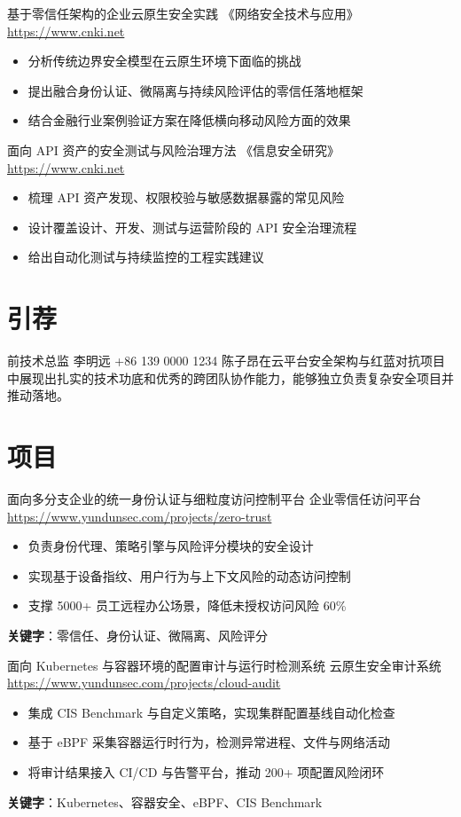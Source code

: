 \documentclass[a4paper, serif, 10pt]{moderncv}
\begin{document}
        {基于零信任架构的企业云原生安全实践}
        {《网络安全技术与应用》}
        {\url{https://www.cnki.net}}
        {}
        {\begin{itemize}
\item 分析传统边界安全模型在云原生环境下面临的挑战
\item 提出融合身份认证、微隔离与持续风险评估的零信任落地框架
\item 结合金融行业案例验证方案在降低横向移动风险方面的效果
\end{itemize}}

        {面向 API 资产的安全测试与风险治理方法}
        {《信息安全研究》}
        {\url{https://www.cnki.net}}
        {}
        {\begin{itemize}
\item 梳理 API 资产发现、权限校验与敏感数据暴露的常见风险
\item 设计覆盖设计、开发、测试与运营阶段的 API 安全治理流程
\item 给出自动化测试与持续监控的工程实践建议
\end{itemize}}
\section{引荐}

        {前技术总监}
        {李明远}
        {+86 139 0000 1234}
        {}
        {陈子昂在云平台安全架构与红蓝对抗项目中展现出扎实的技术功底和优秀的跨团队协作能力，能够独立负责复杂安全项目并推动落地。}
\section{项目}

        {面向多分支企业的统一身份认证与细粒度访问控制平台}
        {企业零信任访问平台}
        {\url{https://www.yundunsec.com/projects/zero-trust}}
        {}
        {\begin{itemize}
\item 负责身份代理、策略引擎与风险评分模块的安全设计
\item 实现基于设备指纹、用户行为与上下文风险的动态访问控制
\item 支撑 5000+ 员工远程办公场景，降低未授权访问风险 60\%
\end{itemize}
\textbf{关键字}：零信任、身份认证、微隔离、风险评分}

        {面向 Kubernetes 与容器环境的配置审计与运行时检测系统}
        {云原生安全审计系统}
        {\url{https://www.yundunsec.com/projects/cloud-audit}}
        {}
        {\begin{itemize}
\item 集成 CIS Benchmark 与自定义策略，实现集群配置基线自动化检查
\item 基于 eBPF 采集容器运行时行为，检测异常进程、文件与网络活动
\item 将审计结果接入 CI/CD 与告警平台，推动 200+ 项配置风险闭环
\end{itemize}
\textbf{关键字}：Kubernetes、容器安全、eBPF、CIS Benchmark}
\end{document}
